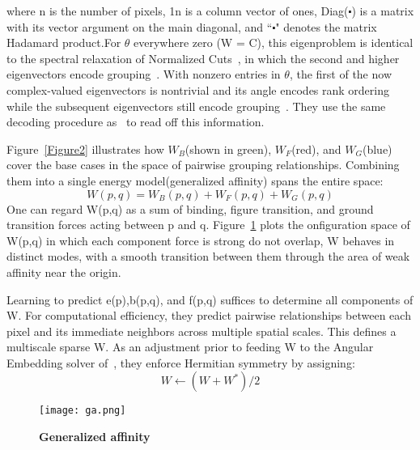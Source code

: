 \documentclass[10pt,twocolumn,letterpaper]{article}
\begin{document}
where n is the number of pixels, 1n is a column vector of ones, Diag($\centerdot$) is a matrix with its vector argument on the main diagonal, and ``$\centerdot$" denotes the matrix Hadamard product.For $\theta$ everywhere zero (W = C), this eigenproblem is identical to the spectral relaxation of Normalized Cuts~\cite{name29}, in which the second and higher eigenvectors encode grouping~\cite{name2,name29}. With nonzero entries in $\theta$, the first of the now complex-valued eigenvectors is nontrivial and its angle encodes rank ordering while the subsequent eigenvectors still encode grouping~\cite{name22}. They use the same decoding procedure as~\cite{name15} to read off this information.\\
\par Figure~\ref{Figure2} illustrates how $W_B$(shown in green), $W_F$(red), and $W_G$(blue) cover the base cases in the space of pairwise grouping relationships. Combining them into a single energy model(generalized affinity) spans the entire space:
\begin{equation}
 W(p,q)=W_B(p,q)+W_F(p,q)+W_G(p,q)
\end{equation}
One can regard W(p,q) as a sum of binding, figure transition, and ground transition forces acting between p and q. Figure~\ref{Figure3} plots the onfiguration space of W(p,q) in which each component force is strong do not overlap, W behaves in distinct modes, with a smooth transition between them through the area of weak affinity near the origin.
\par Learning to predict e(p),b(p,q), and f(p,q) suffices to determine all components of W. For computational efficiency, they predict pairwise relationships between each pixel and its immediate neighbors across multiple spatial scales. This defines a multiscale sparse W. As an adjustment prior to feeding W to the Angular Embedding solver of~\cite{name23}, they enforce Hermitian symmetry by assigning:
\begin{equation}
W \gets(W+W^*)/2
\end{equation}
 \begin{figure}[!htb]
 \centering
 \texttt{[image: ga.png]}\\
 \caption{ \textbf{Generalized affinity}}\label{Figure3}
 \end{figure}


\end{document}
